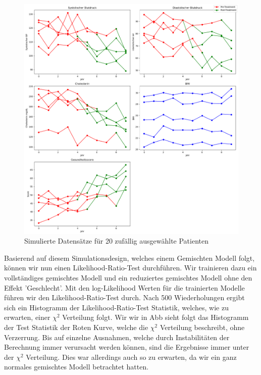 \documentclass[%
thesis=student,%
coverpage=false,%
titlepage=false,%
headmarks=true, %
german,%
font=libertine, %
math=newpxtx, %
BCOR=5mm,%
coverBCOR=11mm%
]{tumbook}
\theoremstyle{break}
\begin{document}
\begin{figure}[h]
	\centering
	\includegraphics[width=\linewidth]{plots/Herzgesundheit_Datensatz.png}
	\caption{Simulierte Datensätze für 20 zufällig ausgewählte Patienten}
	\label{fig:sample_image}
\end{figure} 
Basierend auf diesem Simulationsdesign, welches einem Gemischten Modell folgt, können wir nun einen Likelihood-Ratio-Test durchführen. Wir trainieren dazu ein vollständiges gemischtes Modell und ein reduziertes gemischtes Modell ohne den Effekt 'Geschlecht'. Mit den log-Likelihood Werten für die trainierten Modelle führen wir den Likelihood-Ratio-Test durch. Nach 500 Wiederholungen ergibt sich ein Histogramm der Likelihood-Ratio-Test Statistik, welches, wie zu erwarten, einer $\chi^2$ Verteilung folgt. Wir wir in Abb sieht folgt das Histogramm der Test Statistik der Roten Kurve, welche die $\chi^2$ Verteilung beschreibt, ohne Verzerrung. Bis auf einzelne Ausnahmen, welche durch Instabilitäten der Berechnung immer verursacht werden können, sind die Ergebnisse immer unter der $\chi^2$ Verteilung. Dies war allerdings auch so zu erwarten, da wir ein ganz normales gemischtes Modell betrachtet hatten.
\end{document}
